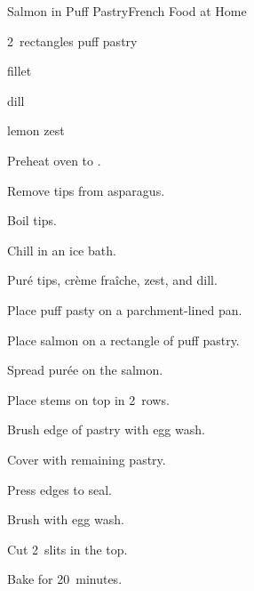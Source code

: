 \begin{recipe}{Salmon in Puff Pastry}{French Food at Home}{}

\begin{ingredients}
\item 2~rectangles puff pastry
\item {} fillet
\item {}
\item dill
\item lemon zest
\item \C{\quarter} 
\end{ingredients}

\begin{directions}
\item Preheat oven to .
\item Remove tips from asparagus.
\item Boil tips.
\item Chill in an ice bath.
\item Puré tips, crème fraîche, zest, and dill.
\item Place puff pasty on a parchment-lined pan.
\item Place salmon on a rectangle of puff pastry.
\item Spread purée on the salmon.
\item Place stems on top in 2~rows.
\item Brush edge of pastry with egg wash.
\item Cover with remaining pastry.
\item Press edges to seal.
\item Brush with egg wash.
\item Cut 2~slits in the top.
\item Bake for 20~minutes.
\end{directions}

\end{recipe}
